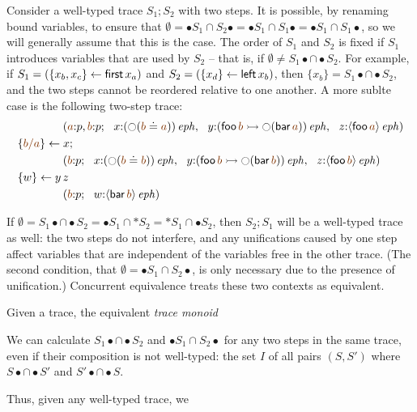 Consider a well-typed trace $S_1; S_2$ with two steps. It is possible,
by renaming bound variables, to ensure that $\emptyset = {\bullet}S_1
\cap S_2{\bullet} = {\bullet}S_1 \cap S_1{\bullet} = {\bullet}S_1 \cap
S_1{\bullet}$, so we will generally assume that this is the case.  The
order of $S_1$ and $S_2$ is fixed if $S_1$ introduces variables that
are used by $S_2$ -- that is, if $\emptyset \neq S_1{\bullet} \cap
{\bullet}S_2$. For example, if $S_1 = (\{{x_b, x_c}\} \leftarrow {\sf
  first}\,x_a)$ and $S_2 = (\{{x_d}\} \leftarrow {\sf left}\,x_b)$, then
$\{x_b\} = S_1{\bullet} \cap {\bullet}S_2$, and the two steps cannot
be reordered relative to one another. A more sublte case is the following
two-step trace:
\begin{align*}
& \qquad\qquad
(\lf{a}{:}p, \lf{b}{:}p; ~~ x{:}\iseph{\left({\ocircle}(\lf{b} \doteq \lf{a})\right)}, ~~
 y{:}\iseph{\left({\sf foo}\,\lf{b} 
                 \lefti {\ocircle}({\sf bar}\, \lf{a})\right)}, ~~
 z{:}\iseph{\susp{{\sf foo}\,\lf{a}}})
\\
& \trstep{\lf{b/a}}{x};
\\
& \qquad\qquad
(\lf{b}{:}p; ~~ x{:}\iseph{\left({\ocircle}(\lf{b} \doteq \lf{b})\right)}, ~~
 y{:}\iseph{\left({\sf foo}\,\lf{b} 
                 \lefti {\ocircle}({\sf bar}\, \lf{b})\right)}, ~~
 z{:}\iseph{\susp{{\sf foo}\,\lf{b}}})
\\
& \trstep{w}{y\,z} 
\\
& \qquad\qquad
(\lf{b}{:}p; ~~ w{:}\iseph{\susp{{\sf bar}\,\lf{b}}})
\end{align*}

 If $\emptyset = S_1{\bullet} \cap {\bullet}S_2 =
{\bullet}S_1 \cap {\ast}S_2 = {\ast}S_1 \cap {\bullet}S_2$, then $S_2;
S_1$ will be a well-typed trace as well: the two steps do not
interfere, and any unifications caused by one step affect variables
that are independent of the variables free in the other trace. (The
second condition, that $\emptyset = {\bullet}S_1 \cap S_2{\bullet}$,
is only necessary due to the presence of unification.) Concurrent
equivalence treats these two contexts as equivalent.

Given a trace, the equivalent {\it trace monoid} 

We can calculate 
$S_1{\bullet} \cap {\bullet}S_2$ and ${\bullet}S_1 \cap S_2{\bullet}$ 
for any two steps in the same trace, even if their composition is 
not well-typed: the set $I$ of all pairs $(S, S')$ where 
$S{\bullet} \cap {\bullet}S'$ and $S'{\bullet} \cap {\bullet}S$.

Thus, given any well-typed trace, we 

